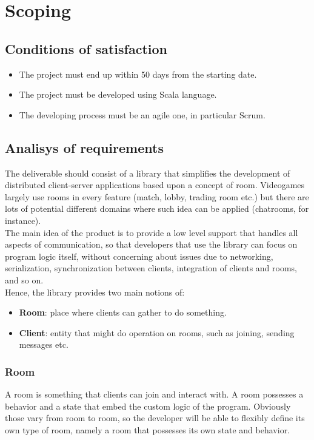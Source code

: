 \chapter{Scoping}

\section{Conditions of satisfaction}

\begin{itemize}
\item The project must end up within 50 days from the starting date. 
\item The project must be developed using Scala language.
\item The developing process must be an agile one, in particular Scrum.
\end{itemize}

\section{Analisys of requirements}

The deliverable should consist of a library that simplifies the development of distributed client-server applications based upon a concept of room. Videogames largely use rooms in every feature (match, lobby, trading room etc.) but there are lots of potential different domains where such idea can be applied (chatrooms, for instance).
\\
The main idea of the product is to provide a low level support that handles all aspects of communication, so that developers that use the library can focus on program logic itself, without concerning about issues due to networking, serialization, synchronization between clients, integration of clients and rooms, and so on.
\\
Hence, the library provides two main notions of:
\begin{itemize}
\item \textbf{Room}: place where clients can gather to do something.
\item \textbf{Client}: entity that might do operation on rooms, such as joining, sending messages etc.
\end{itemize} 

\subsection{Room}

A room is something that clients can join and interact with. A room possesses a behavior and a state that embed the custom logic of the program. Obviously those vary from room to room, so the developer will be able to flexibly define its own type of room, namely a room that possesses its own state and behavior.

